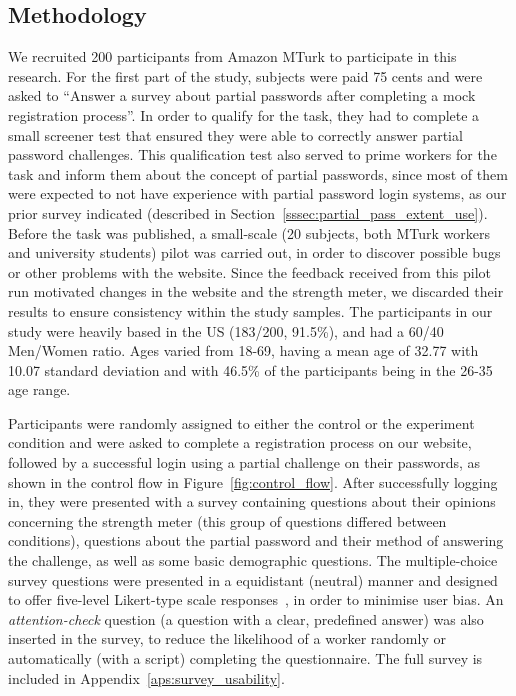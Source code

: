   \subsection{Methodology}
    \label{ssec:usability_setup}
    We recruited 200 participants from Amazon MTurk to participate in this research. For the first part of the study, subjects were paid 75 cents and were asked to ``Answer a survey about partial passwords after completing a mock registration process''. In order to qualify for the task, they had to complete a small screener test that ensured they were able to correctly answer partial password challenges. This qualification test also served to prime workers for the task and inform them about the concept of partial passwords, since most of them were expected to not have experience with partial password login systems, as our prior survey indicated (described in Section~\ref{sssec:partial_pass_extent_use}). Before the task was published, a small-scale (20 subjects, both MTurk workers and university students) pilot was carried out, in order to discover possible bugs or other problems with the website. Since the feedback received from this pilot run motivated changes in the website and the strength meter, we discarded their results to ensure consistency within the study samples. The participants in our study were heavily based in the US (183/200, 91.5\%), and had a 60/40 Men/Women ratio. Ages varied from 18-69, having a mean age of 32.77 with 10.07 standard deviation and with 46.5\% of the participants being in the 26-35 age range.

    Participants were randomly assigned to either the control or the experiment condition and were asked to complete a registration process on our website, followed by a successful login using a partial challenge on their passwords, as shown in the control flow in Figure~\ref{fig:control_flow}. After successfully logging in, they were presented with a survey containing questions about their opinions concerning the strength meter (this group of questions differed between conditions), questions about the partial password and their method of answering the challenge, as well as some basic demographic questions. The multiple-choice survey questions were presented in a equidistant (neutral) manner and designed to offer five-level Likert-type scale responses~\cite{likert}, in order to minimise user bias. An \emph{attention-check} question (a question with a clear, predefined answer) was also inserted in the survey, to reduce the likelihood of a worker randomly or automatically (with a script) completing the questionnaire. The full survey is included in Appendix~\ref{aps:survey_usability}.

